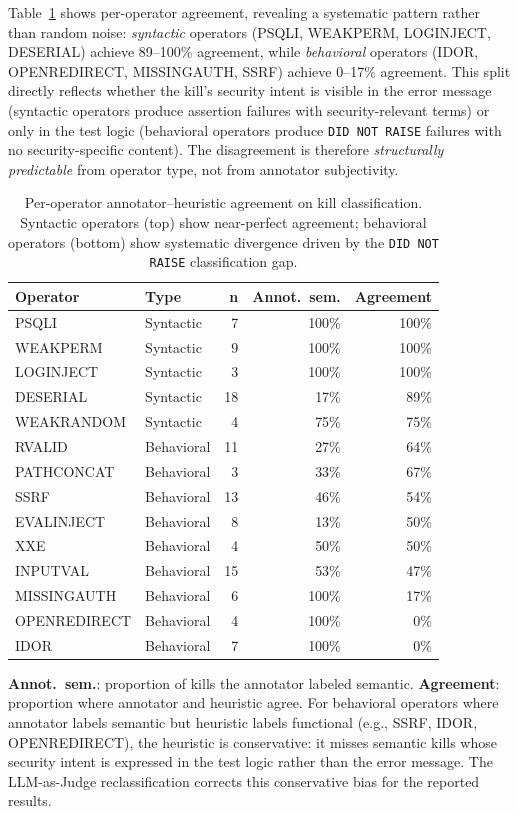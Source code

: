 \documentclass[sigconf,anonymous,review]{acmart}
\begin{document}
{{Table~\ref{tab:ira} shows per-operator agreement, revealing a
systematic pattern rather than random noise: \emph{syntactic}
operators (PSQLI, WEAKPERM, LOGINJECT, DESERIAL) achieve 89--100\%
agreement, while \emph{behavioral} operators (IDOR, OPENREDIRECT,
MISSINGAUTH, SSRF) achieve 0--17\% agreement. This split directly
reflects whether the kill's security intent is visible in the error
message (syntactic operators produce assertion failures with
security-relevant terms) or only in the test logic (behavioral
operators produce \texttt{DID NOT RAISE} failures with no security-specific
content). The disagreement is therefore \emph{structurally
predictable} from operator type, not from annotator subjectivity.

\begin{table}[t]
\caption{Per-operator annotator--heuristic agreement on kill
classification. Syntactic operators (top) show near-perfect
agreement; behavioral operators (bottom) show systematic divergence
driven by the \texttt{DID NOT RAISE} classification gap.}
\label{tab:ira}
\small
\setlength{\tabcolsep}{4pt}
\begin{tabular}{llrrr}
\toprule
\textbf{Operator} & \textbf{Type} &
\textbf{n} &
\textbf{Annot.\ sem.} &
\textbf{Agreement} \\
\midrule
PSQLI        & Syntactic &  7 & 100\% & 100\% \\
WEAKPERM     & Syntactic &  9 & 100\% & 100\% \\
LOGINJECT    & Syntactic &  3 & 100\% & 100\% \\
DESERIAL     & Syntactic & 18 &  17\% &  89\% \\
WEAKRANDOM   & Syntactic &  4 &  75\% &  75\% \\
\midrule
RVALID       & Behavioral & 11 &  27\% &  64\% \\
PATHCONCAT   & Behavioral &  3 &  33\% &  67\% \\
SSRF         & Behavioral & 13 &  46\% &  54\% \\
EVALINJECT   & Behavioral &  8 &  13\% &  50\% \\
XXE          & Behavioral &  4 &  50\% &  50\% \\
INPUTVAL     & Behavioral & 15 &  53\% &  47\% \\
MISSINGAUTH  & Behavioral &  6 & 100\% &  17\% \\
OPENREDIRECT & Behavioral &  4 & 100\% &   0\% \\
IDOR         & Behavioral &  7 & 100\% &   0\% \\
\bottomrule
\end{tabular}
\vspace{3pt}
{\footnotesize \textbf{Annot.\ sem.}: proportion of kills the
annotator labeled semantic. \textbf{Agreement}: proportion where
annotator and heuristic agree. For behavioral operators where
annotator labels semantic but heuristic labels functional (e.g.,
SSRF, IDOR, OPENREDIRECT), the heuristic is conservative: it misses
semantic kills whose security intent is expressed in the test logic
rather than the error message. The LLM-as-Judge reclassification
corrects this conservative bias for the reported results.}
\end{table}
}
}
\end{document}
